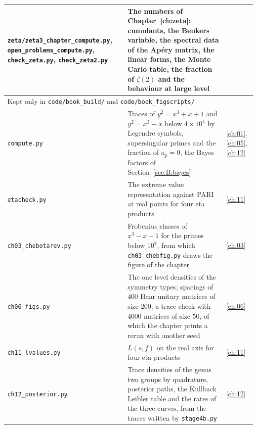 {\begin{longtable}{p{1.4in}p{2.95in}p{0.6in}}
\texttt{zeta/\allowbreak zeta3\_chapter\_\allowbreak compute.py}, \texttt{open\_problems\_\allowbreak compute.py}, \texttt{check\_zeta.py}, \texttt{check\_zeta2.py} & The numbers of Chapter~\ref{ch:zeta}: cumulants, the Beukers variable, the spectral data of the Ap\'ery matrix, the linear forms, the Monte Carlo table, the fraction of $\zeta(2)$ and the behaviour at large level\\
\midrule
\multicolumn{3}{l}{Kept only in \texttt{code/book\_build/} and \texttt{code/book\_figscripts/}}\\
\midrule
\texttt{compute.py} & Traces of $y^2=x^3+x+1$ and $y^2=x^3-x$ below $4\times10^4$ by Legendre symbols, supersingular primes and the fraction of $a_p=0$, the Bayes factors of Section~\ref{sec:B:bayes} & \ref{ch:01}, \ref{ch:05}, \ref{ch:12}\\
\texttt{etacheck.py} & The extreme value representation against PARI at real points for four eta products & \ref{ch:11}\\
\texttt{ch03\_chebotarev.py} & Frobenius classes of $x^3-x-1$ for the primes below $10^7$, from which \texttt{ch03\_chebfig.py} draws the figure of the chapter & \ref{ch:03}\\
\texttt{ch06\_figs.py} & The one level densities of the symmetry types; spacings of $400$ Haar unitary matrices of size $200$; a trace check with $4000$ matrices of size $50$, of which the chapter prints a rerun with another seed & \ref{ch:06}\\
\texttt{ch11\_lvalues.py} & $L(s,f)$ on the real axis for four eta products & \ref{ch:11}\\
\texttt{ch12\_posterior.py} & Trace densities of the genus two groups by quadrature, posterior paths, the Kullback Leibler table and the rates of the three curves, from the traces written by \texttt{stage4b.py} & \ref{ch:12}\\
\bottomrule
\end{longtable}
}

